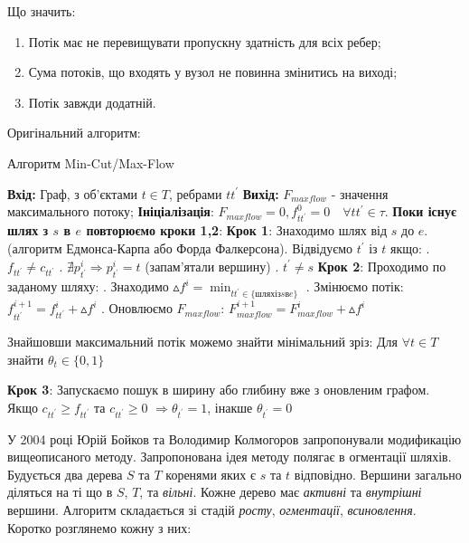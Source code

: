 Що значить:
\begin{enumerate}
    \item Потік має не перевищувати пропускну здатність для всіх ребер;
    \item Сума потоків, що входять у вузол не повинна змінитись на виході;
    \item Потік завжди додатній.
\end{enumerate}

Оригінальний алгоритм:

\begin{algorithm}[H]
    \caption{Алгоритм Min-Cut/Max-Flow}
    \begin{algorithmic}
    \State \textbf{Вхід:} Граф, з об'єктами $t \in T$, ребрами $tt^{'}$
    \State \textbf{Вихід:} $F_{maxflow}$ - значення максимального потоку;
    \State \textbf{Ініціалізація}: $F_{maxflow} = 0, f_{tt^{'}}^{0} = 0 \quad  \forall tt^{'}  \in \tau$.
    \State \textbf{Поки існує шлях з $s$ в $e$ повторюємо кроки 1,2}:    
    \State \textbf{Крок 1}: Знаходимо шлях від $s$ до $e$.
    (алгоритм Едмонса-Карпа або Форда Фалкерсона).
    \State Відвідуємо $t^{'}$ із $t$ якщо:
            \State {}. $f_{tt^{'}} \neq   c_{tt^{'}}$
            \State {}. $ \nexists p_{t^{'}}^{i} \Rightarrow  p_{t^{'}}^{i} = t $ (запам'ятали вершину)
            \State {}. $ t^{'} \neq s $
    \State \textbf{Крок 2}: Проходимо по заданому шляху: 
            \State {}. Знаходимо $ \vartriangle f^{i} = \min_{tt^{'} \in \{шлях із s в e \}} $
            \State {}. Змінюємо потік: $ f_{tt^{'}}^{i+1} = f_{tt^{'}}^{i} + \vartriangle f^{i} $
            \State {}. Оновлюємо $F_{maxflow}$: $ F_{maxflow}^{i+1}  = F_{maxflow}^{i} + \vartriangle f^{i} $ 
    \end{algorithmic}

Знайшовши максимальний потік можемо знайти мінімальний зріз:
Для $\forall t \in T$ знайти $\theta_{t} \in \{0,1\}$
    \begin{algorithmic}
    \State \textbf{Крок 3}: Запускаємо пошук в ширину або глибину вже з оновленим графом.   
    \State \qquad Якщо $c_{tt^{'}} \geqslant f_{tt^{'}}$ та $c_{tt^{'}} \geqslant 0$
    $\Rightarrow \theta_{t^{'}} = 1 $, інакше $\theta_{t^{'}} = 0 $
    \end{algorithmic}
\end{algorithm}

У 2004 році Юрій Бойков та Володимир Колмогоров запропонували модификацію вищеописаного
методу.
Запропонована ідея методу полягає в огментації шляхів. Будується два дерева $S$ та $T$
коренями яких є $s$ та $t$ відповідно. Вершини загально діляться на ті що в $S$, $T$, та 
\textit{вільні}. Кожне дерево має \textit{активні} та \textit{внутрішні} вершини.
Алгоритм складається зі стадій \textit{росту}, \textit{огментації}, \textit{всиновлення}.\\
Коротко розглянемо кожну з них:


